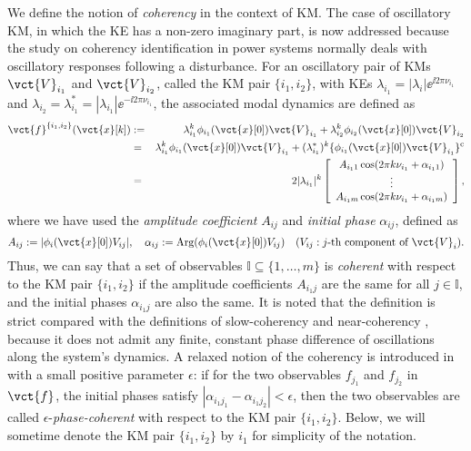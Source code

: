 \documentclass[a4paper,10pt]{article}
\begin{document}
We define the notion of \emph{coherency} in the context of KM.  
The case of oscillatory KM, in which the KE has a non-zero imaginary part, is now addressed because the study on coherency identification in power systems normally deals with oscillatory responses following a disturbance.  
For an oscillatory pair of KMs $\vct{V}_{i_1}$ and $\vct{V}_{i_2}$, called the KM pair $\{i_1,i_2\}$, with KEs $\lambda_{i_1}=|\lambda_i|\ee^{\ii 2\pi\nu_{i_1}}$ and $\lambda_{i_2}=\lambda^\ast_{i_1}=|\lambda_{i_1}|\ee^{-\ii 2\pi\nu_{i_1}}$, the associated modal dynamics are defined as
\begin{eqnarray}
\vct{f}^{\{i_1,i_2\}}(\vct{x}[k])
&:=& \lambda^k_{i_1}\phi_{i_1}(\vct{x}[0])\vct{V}_{i_1}+\lambda_{i_2}^k\phi_{i_2}(\vct{x}[0])\vct{V}_{i_2}
\nonumber\\
&=& \lambda^k_{i_1}\phi_{i_1}(\vct{x}[0])\vct{V}_{i_1}+(\lambda^\ast_{i_1})^k\{\phi_{i_1}(\vct{x}[0])\vct{V}_{i_1}\}^\mathrm{c}
\nonumber\\
&=& 2|\lambda_{i_1}|^k
\left[
\begin{array}{c}
A_{i_11}\cos(2\pi k\nu_{i_1}+\alpha_{i_11})\\
\vdots\\
A_{i_1m}\cos(2\pi k\nu_{i_1}+\alpha_{i_1m})
\end{array}
\right],
\label{eqn:te2}
\end{eqnarray}
where we have used the \emph{amplitude coefficient} $A_{ij}$ and \emph{initial phase} $\alpha_{ij}$, defined as
\begin{equation}
A_{ij}:=|\phi_i(\vct{x}[0])V_{ij}|,\makebox[1em]{}
\alpha_{ij}:=\mathrm{Arg}(\phi_i(\vct{x}[0])V_{ij})\makebox[1em]{}
(V_{ij}: \textrm{$j$-th component of $\vct{V}_i$}).
\label{eqn:te}
\end{equation}
Thus, we can say that a set of observables $\mathbb{I}\subseteq\{1,\ldots,m\}$ is \emph{coherent} with respect to the KM pair $\{i_1,i_2\}$ if the amplitude coefficients $A_{i_1j}$ are the same for all $j\in\mathbb{I}$, and the initial phases $\alpha_{i_1j}$ are also the same.  
It is noted that the definition is strict compared with the definitions of slow-coherency \cite{Avramovic_AUTO16,Winkelman_IEEETPAS100} and near-coherency \cite{Sastry_IEEETAC26}, because it does not admit any finite, constant phase difference of oscillations along the system's  dynamics.  
A relaxed notion of the coherency is introduced in \cite{Marko_CHAOS22,Georgescu_EB86,Raak_IEEETPWRS2015} with a small positive parameter $\epsilon$: if for the two observables $f_{j_1}$ and $f_{j_2}$ in $\vct{f}$, the initial phases satisfy $|\alpha_{i_1j_1}-\alpha_{i_1j_2}|<\epsilon$, then the two observables are called $\epsilon$-\emph{phase-coherent} with respect to the KM pair $\{i_1,i_2\}$.  
Below, we will sometime denote the KM pair $\{i_1,i_2\}$ by $i_1$ for simplicity of the notation.  
\end{document}
